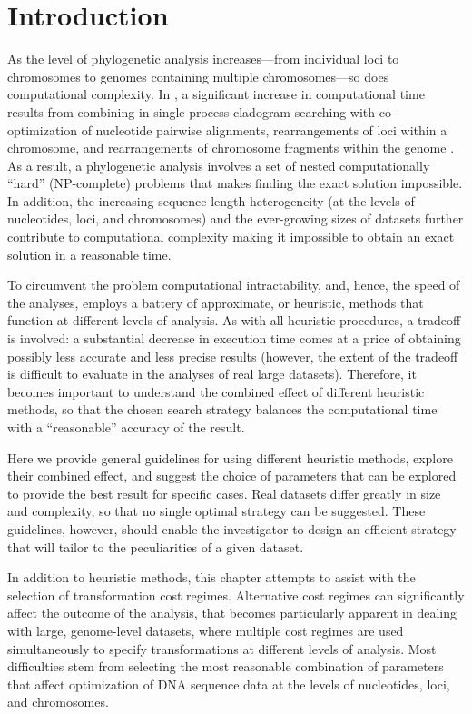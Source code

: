 \section{Introduction}

As the level of phylogenetic analysis increases---from individual loci to chromosomes to genomes containing multiple chromosomes---so does computational complexity. In \poy, a significant increase in computational time results from combining in single process cladogram searching with co-optimization of nucleotide pairwise alignments, rearrangements of loci within a chromosome, and rearrangements of chromosome fragments within the genome . As a result, a phylogenetic analysis involves a set of nested computationally ``hard'' (NP-complete) problems that makes finding the exact solution impossible. In addition, the increasing sequence length heterogeneity (at the levels of nucleotides, loci, and chromosomes) and the ever-growing sizes of datasets further contribute to computational complexity making it impossible to obtain an exact solution in a reasonable time.

To circumvent the problem computational intractability, and, hence, the speed of the analyses, \poy employs a battery of approximate, or heuristic, methods that function at different levels of analysis. As with all heuristic procedures, a tradeoff is involved: a substantial decrease in execution time comes at a price of obtaining possibly less accurate  and less precise results (however, the extent of the tradeoff is difficult to evaluate in the analyses of real large datasets). Therefore, it becomes important to understand the combined effect of different heuristic methods, so that the chosen search strategy balances the computational time with a ``reasonable'' accuracy of the result.

Here we provide general guidelines for using different heuristic methods, explore their combined effect, and suggest the choice of parameters that can be explored to provide the best result for specific cases. Real datasets differ greatly in size and complexity, so that no single optimal strategy can be suggested. These guidelines, however, should enable the investigator to design an efficient strategy that will tailor to the peculiarities of a given dataset.

In addition to heuristic methods, this chapter attempts to assist with the selection of transformation cost regimes. Alternative cost regimes can significantly affect the outcome of the analysis, that becomes particularly apparent in dealing with large, genome-level datasets, where multiple cost regimes are used simultaneously to specify transformations at different levels of analysis. Most difficulties stem from selecting the most reasonable combination of parameters that affect optimization of DNA sequence data at the levels of nucleotides, loci, and chromosomes.

